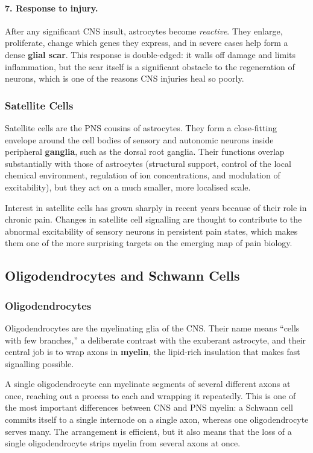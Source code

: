 \documentclass[11pt]{article}
\begin{document}
\paragraph{7. Response to injury.} After any significant CNS insult, astrocytes become \textit{reactive}. They enlarge, proliferate, change which genes they express, and in severe cases help form a dense \textbf{glial scar}. This response is double-edged: it walls off damage and limits inflammation, but the scar itself is a significant obstacle to the regeneration of neurons, which is one of the reasons CNS injuries heal so poorly.

\subsubsection{Satellite Cells}

Satellite cells are the PNS cousins of astrocytes. They form a close-fitting envelope around the cell bodies of sensory and autonomic neurons inside peripheral \textbf{ganglia}, such as the dorsal root ganglia. Their functions overlap substantially with those of astrocytes (structural support, control of the local chemical environment, regulation of ion concentrations, and modulation of excitability), but they act on a much smaller, more localised scale.

Interest in satellite cells has grown sharply in recent years because of their role in chronic pain. Changes in satellite cell signalling are thought to contribute to the abnormal excitability of sensory neurons in persistent pain states, which makes them one of the more surprising targets on the emerging map of pain biology.

\subsection{Oligodendrocytes and Schwann Cells}

\subsubsection{Oligodendrocytes}

Oligodendrocytes are the myelinating glia of the CNS. Their name means ``cells with few branches,'' a deliberate contrast with the exuberant astrocyte, and their central job is to wrap axons in \textbf{myelin}, the lipid-rich insulation that makes fast signalling possible.

A single oligodendrocyte can myelinate segments of several different axons at once, reaching out a process to each and wrapping it repeatedly. This is one of the most important differences between CNS and PNS myelin: a Schwann cell commits itself to a single internode on a single axon, whereas one oligodendrocyte serves many. The arrangement is efficient, but it also means that the loss of a single oligodendrocyte strips myelin from several axons at once.
\end{document}
